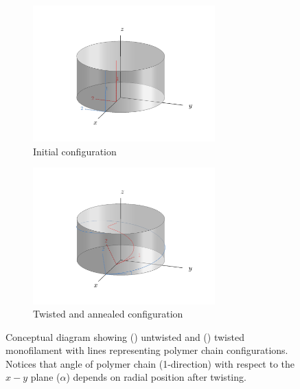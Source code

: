 \documentclass[twocolumn,10pt]{asme2e}
\begin{document}
%
\begin{figure}
    \centering
     \begin{subfigure}[b]{0.5\textwidth}
        \includegraphics[width=7cm, clip = true, trim = {0.8in 0.5in  0.8in 0.8in}]{../Images/helix_2_initial.pdf}
        \caption{Initial configuration }
        \label{fig:helix_init}
        \end{subfigure}
     \begin{subfigure}[b]{0.5\textwidth}
        \includegraphics[width=7cm, clip = true, trim = {0.8in 0.5in  0.8in 0.8in}]{../Images/helix_2.pdf}
        \caption{Twisted and annealed configuration}
        \label{fig:helix_final}
        \end{subfigure}
        \caption{Conceptual diagram showing () untwisted and () twisted monofilament with lines representing polymer chain configurations. Notices that angle of polymer chain (1-direction) with respect to the $x-y$ plane ($\alpha$) depends on radial position after twisting.}
        \label{fig:helix}
\end{figure}
\end{document}
